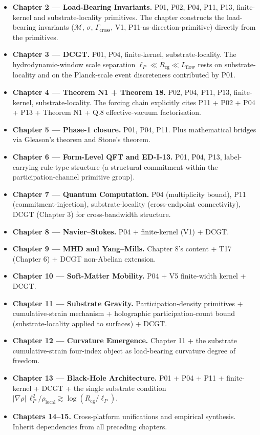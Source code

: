 \documentclass[11pt]{book}
\begin{document}
\begin{itemize}
\item \textbf{Chapter 2 — Load-Bearing Invariants.} P01, P02, P04, P11, P13, finite-kernel and substrate-locality primitives. The chapter constructs the load-bearing invariants ($\mathcal{M}$, $\sigma$, $\Gamma_\mathrm{cross}$, V1, P11-as-direction-primitive) directly from the primitives.
\item \textbf{Chapter 3 — DCGT.} P01, P04, finite-kernel, substrate-locality. The hydrodynamic-window scale separation $\ell_P \ll R_\mathrm{cg} \ll L_\mathrm{flow}$ rests on substrate-locality and on the Planck-scale event discreteness contributed by P01.
\item \textbf{Chapter 4 — Theorem N1 + Theorem 18.} P02, P04, P11, P13, finite-kernel, substrate-locality. The forcing chain explicitly cites P11 + P02 + P04 + P13 + Theorem N1 + Q.8 effective-vacuum factorisation.
\item \textbf{Chapter 5 — Phase-1 closure.} P01, P04, P11. Plus mathematical bridges via Gleason's theorem and Stone's theorem.
\item \textbf{Chapter 6 — Form-Level QFT and ED-I-13.} P01, P04, P13, label-carrying-rule-type structure (a structural commitment within the participation-channel primitive group).
\item \textbf{Chapter 7 — Quantum Computation.} P04 (multiplicity bound), P11 (commitment-injection), substrate-locality (cross-endpoint connectivity), DCGT (Chapter 3) for cross-bandwidth structure.
\item \textbf{Chapter 8 — Navier–Stokes.} P04 + finite-kernel (V1) + DCGT.
\item \textbf{Chapter 9 — MHD and Yang–Mills.} Chapter 8's content + T17 (Chapter 6) + DCGT non-Abelian extension.
\item \textbf{Chapter 10 — Soft-Matter Mobility.} P04 + V5 finite-width kernel + DCGT.
\item \textbf{Chapter 11 — Substrate Gravity.} Participation-density primitives + cumulative-strain mechanism + holographic participation-count bound (substrate-locality applied to surfaces) + DCGT.
\item \textbf{Chapter 12 — Curvature Emergence.} Chapter 11 + the substrate cumulative-strain four-index object as load-bearing curvature degree of freedom.
\item \textbf{Chapter 13 — Black-Hole Architecture.} P01 + P04 + P11 + finite-kernel + DCGT + the single substrate condition $|\nabla\rho|\,\ell_P^2/\rho_\mathrm{local} \gtrsim \log(R_\mathrm{cg}/\ell_P)$.
\item \textbf{Chapters 14–15.} Cross-platform unifications and empirical synthesis. Inherit dependencies from all preceding chapters.
\end{itemize}
\end{document}
